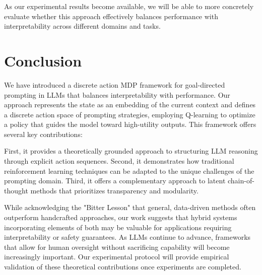 \documentclass[10pt,journal,compsoc]{IEEEtran}
\begin{document}
As our experimental results become available, we will be able to more concretely evaluate whether this approach effectively balances performance with interpretability across different domains and tasks.

\section{Conclusion}

We have introduced a discrete action MDP framework for goal-directed prompting in LLMs that balances interpretability with performance. Our approach represents the state as an embedding of the current context and defines a discrete action space of prompting strategies, employing Q-learning to optimize a policy that guides the model toward high-utility outputs. This framework offers several key contributions:

First, it provides a theoretically grounded approach to structuring LLM reasoning through explicit action sequences. Second, it demonstrates how traditional reinforcement learning techniques can be adapted to the unique challenges of the prompting domain. Third, it offers a complementary approach to latent chain-of-thought methods that prioritizes transparency and modularity.

While acknowledging the "Bitter Lesson" that general, data-driven methods often outperform handcrafted approaches, our work suggests that hybrid systems incorporating elements of both may be valuable for applications requiring interpretability or safety guarantees. As LLMs continue to advance, frameworks that allow for human oversight without sacrificing capability will become increasingly important. Our experimental protocol will provide empirical validation of these theoretical contributions once experiments are completed.
\end{document}

